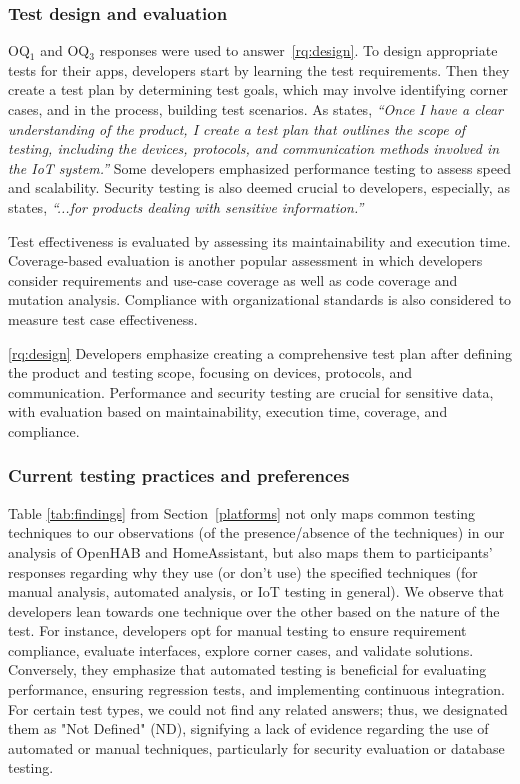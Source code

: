 \subsubsection{Test design and evaluation} 
OQ$_{1}$ and OQ$_{3}$ responses were used to answer~\ref{rq:design}. To design appropriate tests for their apps, developers start by learning the test requirements. Then they create a test plan by determining test goals, which may involve identifying corner cases, and in the process, building test scenarios. As  states, \textit{``Once I have a clear understanding of the product, I create a test plan that outlines the scope of testing, including the devices, protocols, and communication methods involved in the IoT system.''} Some developers emphasized performance testing to assess speed and scalability. Security testing is also deemed crucial to developers, especially, as  states, \textit{``...for products dealing with sensitive information.''}

Test effectiveness is evaluated by assessing its maintainability and execution time. Coverage-based evaluation is another popular assessment in which developers consider requirements and use-case coverage as well as code coverage and mutation analysis. Compliance with organizational standards is also considered to measure test case effectiveness.
\begin{boxK}
\ref{rq:design} Developers emphasize creating a comprehensive test plan after defining the product and testing scope, focusing on devices, protocols, and communication. Performance and security testing are crucial for sensitive data, with evaluation based on maintainability, execution time, coverage, and compliance.

\end{boxK}

\subsubsection {Current testing practices and preferences}
Table \ref{tab:findings} from Section~\ref{platforms} not only maps common testing techniques to our observations (of the presence/absence of the techniques) in our analysis of OpenHAB and HomeAssistant, but also maps them to participants' responses regarding why they use (or don't use) the specified techniques (\eg for manual analysis, automated analysis, or IoT testing in general). 
We observe that developers lean towards one technique over the other based on the nature of the test. For instance, developers opt for manual testing to ensure requirement compliance, evaluate interfaces, explore corner cases, and validate solutions. Conversely, they emphasize that automated testing is beneficial for evaluating performance, ensuring regression tests, and implementing continuous integration. For certain test types, we could not find any related answers; thus, we designated them as "Not Defined" (ND), signifying a lack of evidence regarding the use of automated or manual techniques, particularly for security evaluation or database testing.

